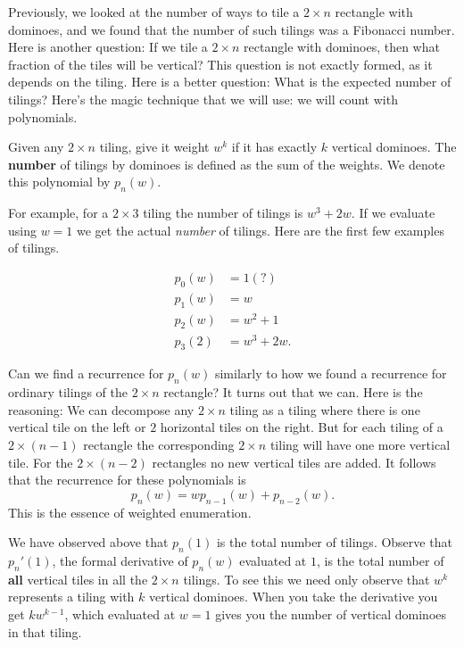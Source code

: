 Previously, we looked at the number of ways to tile a $2 \times n$ rectangle with dominoes, and we found that the number of such tilings was a Fibonacci number. Here is another question: If we tile a $2 \times n$ rectangle with dominoes, then what fraction of the tiles will be vertical? This question is not exactly formed, as it depends on the tiling. Here is a better question: What is the expected number of tilings? Here's the magic technique that we will use: we will count with polynomials.

\begin{definition}
Given any $2 \times n$ tiling, give it weight $w^k$ if it has exactly $k$ vertical dominoes. The \textbf{number} of tilings by dominoes is defined as the sum of the weights. We denote this polynomial by $p_n(w)$. 
\end{definition}

For example, for a $2 \times 3$ tiling the number of tilings is $w^3 + 2w$. If we evaluate using $w = 1$ we get the actual \textit{number} of tilings. Here are the first few examples of tilings.

\begin{align*}
p_0(w) &= 1 (?) \\
p_1(w) &= w \\
p_2(w) &= w^2 + 1 \\
p_3(2) &= w^3 + 2w.
\end{align*}

Can we find a recurrence for $p_n(w)$ similarly to how we found a recurrence for ordinary tilings of the $2 \times n$ rectangle? It turns out that we can. Here is the reasoning: We can decompose any $2 \times n$ tiling as a tiling where there is one vertical tile on the left or $2$ horizontal tiles on the right. But for each tiling of a $2 \times (n-1)$ rectangle the corresponding $2 \times n$ tiling will have one more vertical tile. For the $2 \times (n-2)$ rectangles no new vertical tiles are added. It follows that the recurrence for these polynomials is
\[p_n(w) = wp_{n-1}(w) + p_{n-2}(w).\]
This is the essence of weighted enumeration.

We have observed above that $p_n(1)$ is the total number of tilings. Observe that $p_n'(1)$, the formal derivative of $p_n(w)$ evaluated at $1$, is the total number of \textbf{all} vertical tiles in all the $2\times n$ tilings. To see this we need only observe that $w^k$ represents a tiling with $k$ vertical dominoes. When you take the derivative you get $kw^{k-1}$, which evaluated at $w = 1$ gives you the number of vertical dominoes in that tiling.

